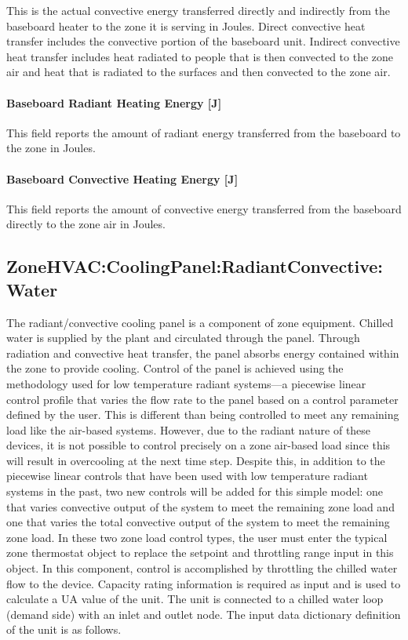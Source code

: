 This is the actual convective energy transferred directly and indirectly from the baseboard heater to the zone it is serving in Joules. Direct convective heat transfer includes the convective portion of the baseboard unit. Indirect convective heat transfer includes heat radiated to people that is then convected to the zone air and heat that is radiated to the surfaces and then convected to the zone air.

\paragraph{Baseboard Radiant Heating Energy {[}J{]}}\label{baseboard-radiant-heating-energy-j-2}

This field reports the amount of radiant energy transferred from the baseboard to the zone in Joules.

\paragraph{Baseboard Convective Heating Energy {[}J{]}}\label{baseboard-convective-heating-energy-j-2}

This field reports the amount of convective energy transferred from the baseboard directly to the zone air in Joules.

\subsection{ZoneHVAC:CoolingPanel:RadiantConvective:Water}\label{zonehvaccoolingpanelradiantconvectivewater}

The radiant/convective cooling panel is a component of zone equipment.  Chilled water is supplied by the plant and circulated through the panel.  Through radiation and convective heat transfer, the panel absorbs energy contained within the zone to provide cooling.  Control of the panel is achieved using the methodology used for low temperature radiant systems—a piecewise linear control profile that varies the flow rate to the panel based on a control parameter defined by the user.  This is different than being controlled to meet any remaining load like the air-based systems.  However, due to the radiant nature of these devices, it is not possible to control precisely on a zone air-based load since this will result in overcooling at the next time step.  Despite this, in addition to the piecewise linear controls that have been used with low temperature radiant systems in the past, two new controls will be added for this simple model: one that varies convective output of the system to meet the remaining zone load and one that varies the total convective output of the system to meet the remaining zone load.  In these two zone load control types, the user must enter the typical zone thermostat object to replace the setpoint and throttling range input in this object.  In this component, control is accomplished by throttling the chilled water flow to the device.  Capacity rating information is required as input and is used to calculate a UA value of the unit. The unit is connected to a chilled water loop (demand side) with an inlet and outlet node. The input data dictionary definition of the unit is as follows.

